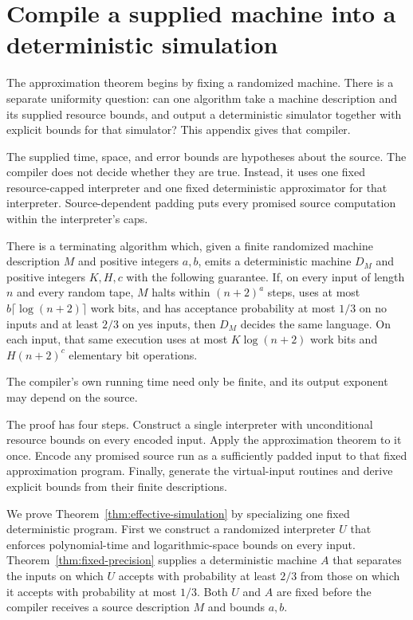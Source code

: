 \section{Compile a supplied machine into a deterministic simulation}
\label{sec:compiler}

The approximation theorem begins by fixing a randomized machine. There is a separate uniformity question: can one algorithm take a machine description and its supplied resource bounds, and output a deterministic simulator together with explicit bounds for that simulator? This appendix gives that compiler.

The supplied time, space, and error bounds are hypotheses about the source. The compiler does not decide whether they are true. Instead, it uses one fixed resource-capped interpreter and one fixed deterministic approximator for that interpreter. Source-dependent padding puts every promised source computation within the interpreter's caps.

\begin{theorem}
\label{thm:effective-simulation}
There is a terminating algorithm which, given a finite randomized machine
description $M$ and positive integers $a,b$, emits a deterministic
machine $D_M$ and positive integers $K,H,c$ with the following guarantee.
If, on every input of length $n$ and every random tape, $M$ halts within
$(n+2)^a$ steps, uses at most $b\lceil\log(n+2)\rceil$ work bits, and
has acceptance probability at most $1/3$ on no inputs and at least
$2/3$ on yes inputs, then $D_M$ decides the same language. On each input,
that same execution uses at most $K\log(n+2)$ work bits and
$H(n+2)^c$ elementary bit operations.
\end{theorem}

The compiler's own running time need only be finite, and its output
exponent may depend on the source.

The proof has four steps. Construct a single interpreter with unconditional resource bounds on every encoded input. Apply the approximation theorem to it once. Encode any promised source run as a sufficiently padded input to that fixed approximation program. Finally, generate the virtual-input routines and derive explicit bounds from their finite descriptions.

We prove Theorem~\ref{thm:effective-simulation} by specializing one fixed deterministic program. First we construct a randomized interpreter
$U$ that enforces polynomial-time and logarithmic-space bounds on every
input. Theorem~\ref{thm:fixed-precision} supplies a deterministic machine
$A$ that separates the inputs on which $U$ accepts with probability at
least $2/3$ from those on which it accepts with probability at most
$1/3$. Both $U$ and $A$ are fixed before the compiler receives a source
description $M$ and bounds $a,b$.

